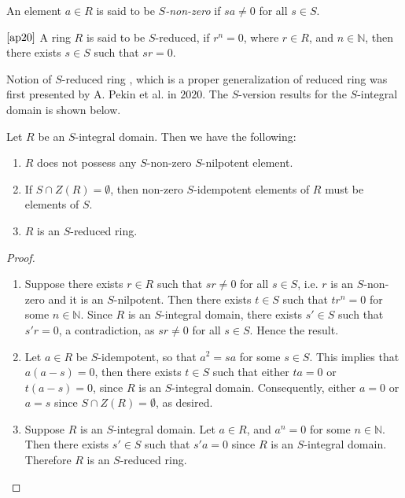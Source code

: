 \documentclass[11pt]{article}
\begin{document}
    \begin{deff}
    An element $a \in R$ is said to be \emph{$S$-non-zero} if $sa \neq 0$ for all $s \in S$.
    \end{deff}
    
	\begin{deff}$\cite{ap20}$
		A ring $R$ is said to be $S$-reduced, if $r^{n}=0$, where $r \in R$, and $n \in\mathbb{N}$, then there exists $s\in S$ such that $sr= 0$.
	\end{deff}
	Notion of $S$-reduced ring \cite{ap20}, which is a proper generalization of reduced ring was first presented by A. Pekin et al. in $2020$. The $S$-version results for the $S$-integral domain is shown below.
	\begin{theorem}\label{si}
		Let $R$ be an $S$-integral domain. Then we have the following:
		\begin{enumerate}
			\item $R$ does not possess any $S$-non-zero $S$-nilpotent element.
			\item If $S\cap Z(R)=\emptyset$, then non-zero $S$-idempotent elements of $R$ must be elements of $S$. 
			\item $R$ is an $S$-reduced ring.
		\end{enumerate}
	\end{theorem}
	\begin{proof}
		\leavevmode
		\begin{enumerate}
			\item Suppose there exists $r\in R$ such that $sr\neq 0$ for all $s\in S$, i.e. $r$ is an $S$-non-zero and it is an $S$-nilpotent. Then there exists $t\in S$ such that $tr^{n}=0$ for some $n\in\mathbb{N}$. Since $R$ is an $S$-integral domain, there exists $s'\in S$ such that $s'r=0$, a contradiction, as $sr\neq 0$ for all $s\in S$. Hence the result.
			\item Let $a\in R$ be $S$-idempotent, so that $a^{2}=sa$ for some $s\in S$. This implies that $a(a-s)=0$, then there exists $t\in S$ such that either $ta=0$ or $t(a-s) =0$, since $R$ is an $S$-integral domain. Consequently, either $a=0$ or $a=s$ since $S\cap Z(R)=\emptyset $, as desired.
			\item Suppose $R$ is an $S$-integral domain. Let $a\in R$, and $a^{n}=0$ for some $n\in\mathbb{N}$. Then there exists $s'\in S$ such that $s'a=0$ since $R$ is an $S$-integral domain. Therefore $R$ is an $S$-reduced ring. 
		\end{enumerate}
	\end{proof}
	
\end{document}
